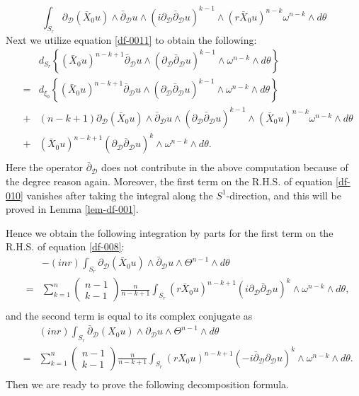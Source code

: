 \documentclass[a4paper,11pt]{amsart}
\numberwithin{equation}{section}
\def\dbar{\bar\partial}
\def\d{\partial}
\def\cD{{\mathcal D}}
\begin{document}
\begin{equation}
\label{df-009}
  \int_{S_r} \d_{\cD} (\bar X_0 u) \wedge 
\dbar_{\cD} u  \wedge (i \d_{\cD} \dbar_{\cD} u)^{k-1} \wedge \left( r \bar X_0 u \right)^{n-k} \omega^{n-k} \wedge d\theta
\end{equation}
Next we utilize equation \eqref{df-0011} to obtain the following:
\begin{eqnarray}
\label{df-010}
&&d_{S_r} \left\{ (\bar X_0 u)^{n-k+1} \dbar_{\cD}u \wedge (\d_{\cD}\dbar_{\cD} u)^{k-1} \wedge \omega^{n-k} \wedge d\theta \right\}
\nonumber\\
&=& d_{\xi_0} \left\{ (\bar X_0 u)^{n-k+1} \dbar_{\cD}u \wedge (\d_{\cD}\dbar_{\cD} u)^{k-1} \wedge \omega^{n-k} \wedge d\theta \right\}
\nonumber\\
&+& (n-k+1) \d_{\cD} (\bar X_0 u) \wedge  
\dbar_{\cD} u  \wedge ( \d_{\cD} \dbar_{\cD} u)^{k-1} \wedge \left(  \bar X_0 u \right)^{n-k} \omega^{n-k} \wedge d\theta
\nonumber\\
&+& (\bar X_0 u)^{n-k +1}  ( \d_{\cD} \dbar_{\cD} u)^{k} \wedge \omega^{n-k}\wedge d\theta.
\nonumber\\
\end{eqnarray}
Here the operator $\dbar_{\cD}$ does not contribute in the above computation 
because of the degree reason again. 
Moreover, the first term on the R.H.S. of equation \eqref{df-010} vanishes 
after taking the integral along the $S^1$-direction, 
and this will be proved in Lemma \ref{lem-df-001}. 

Hence we obtain the following integration by parts for the first term
on the R.H.S. of equation \eqref{df-008}: 
\begin{eqnarray}
\label{df-011}
&& -(inr) \int_{S_r}  \d_{\cD} (\bar X_0 u) \wedge  \dbar_{\cD} u  \wedge \Theta^{n-1} \wedge d\theta
\nonumber\\
&=&  \sum_{k=1}^n  \left( \begin{array}{c} n-1 \\ k-1 \end{array} \right) \frac{n}{n-k+1}
\int_{S_r} (r\bar X_0 u)^{n-k+1} ( i\d_{\cD} \dbar_{\cD} u)^{k} \wedge \omega^{n-k}\wedge d\theta,
\nonumber\\
\end{eqnarray}
and the second term is equal to its complex conjugate as 
\begin{eqnarray}
\label{df-012}
&& (inr) \int_{S_r}  \dbar_{\cD} ( X_0 u) \wedge  \d_{\cD} u  \wedge \Theta^{n-1} \wedge d\theta
\nonumber\\
&=&  \sum_{k=1}^n  \left( \begin{array}{c} n-1 \\ k-1 \end{array} \right) \frac{n}{n-k+1}
\int_{S_r} (rX_0 u)^{n-k+1} ( -i\dbar_{\cD} \d_{\cD} u)^{k} \wedge \omega^{n-k}\wedge d\theta.
\nonumber\\
\end{eqnarray}
Then we are ready to prove the following decomposition formula. 
\end{document}
